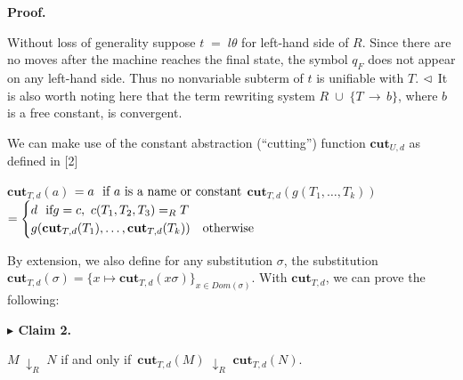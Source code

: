 \documentclass[10pt,a4paper]{amsart}
\begin{document}
\par\medskip\noindent\textbf{Proof.}\par
 
 
Without loss of generality suppose $t\;=\;l\theta$ for left-hand side of $R$. Since there are no moves after the machine reaches the final state, the symbol $q_{F}$ does not appear on any left-hand side. Thus no nonvariable subterm of $t$ is unifiable with $T$. $\hfill\vartriangleleft$ It is also worth noting here that the term rewriting system $R\;\cup\;\{T\,\rightarrow\,b\}$, where $b$ is a free constant, is convergent.\par
 
 
 
We can make use of the constant abstraction (“cutting”) function $\mathbf{cut}_{U,d}$ as defined in [2]\par
    $\displaystyle\mathbf{cut}_{T,d}(a)$ $\displaystyle=a\leavevmode\nobreak\ \text{ if $a$ is a name or constant}$     $\displaystyle\mathbf{cut}_{T,d}(g(T_{1},\ldots,T_{k}))$ $\displaystyle=\begin{cases}d\leavevmode\nobreak\ \leavevmode\nobreak\ \text{if%
 }g=c,\leavevmode\nobreak\ c(T_{1},T_{2},T_{3})=_{R}T\\
g(\mathbf{cut}_{T,d}(T_{1}),\ldots,\mathbf{cut}_{T,d}(T_{k}))&\text{otherwise %
}\end{cases}$    
 
 
By extension, we also define for any substitution $\sigma$, the substitution $\mathbf{cut}_{T,d}(\sigma)=\{x\mapsto\mathbf{cut}_{T,d}(x\sigma)\}_{x\in Dom(%
\sigma)}$. With $\mathbf{cut}_{T,d}$, we can prove the following:\par
 
 
 
\par\medskip\noindent\textbf{$\blacktriangleright$ Claim 2.}\par
 
 
$M\;\downarrow_{R}\;N$ if and only if $\,\mathbf{cut}_{T,d}(M)\;\downarrow_{R}\;\mathbf{cut}_{T,d}(N)$.\par
 
\end{document}
